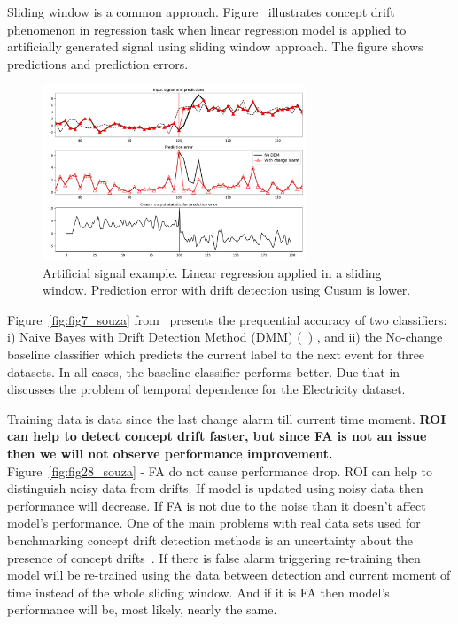 \documentclass[12 pt]{article}
\begin{document}
  Sliding window is a common approach.
  Figure~\cite{fig:art_sig_example} illustrates concept drift phenomenon in regression task when linear regression model is applied to artificially generated signal using sliding window approach. 
  The figure shows predictions and prediction errors.
  \begin{figure}[!htb]
    \centering
    \includegraphics[width=0.7\textwidth]{images/proof_of_concept_linreg_art_sig}
    \caption{Artificial signal example. Linear regression applied in a sliding window. Prediction error with drift detection using Cusum is lower.}\label{fig:art_sig_example}
  \end{figure}

  Figure~\ref{fig:fig7_souza} from~\cite{SouzaRMB20} presents the prequential accuracy of two classifiers: i) Naive Bayes with Drift Detection Method (DMM) (~\cite{gama2004learning}) , and ii) the No-change baseline classifier which predicts the current label to the next event for three datasets. In all cases, the baseline classifier performs better.
  Due that in~\cite{zliobaite2013good} discusses the problem of temporal dependence for the Electricity dataset.

  Training data is data since the last change alarm till current time moment.
  \textbf{ROI can help to detect concept drift faster, but since FA is not an issue then we will not observe performance improvement.}
  Figure~\ref{fig:fig28_souza} - FA do not cause performance drop.
  ROI can help to distinguish noisy data from drifts. If model is updated using noisy data then performance will decrease.
  If FA is not due to the noise than it doesn't affect model's performance. 
  One of the main problems with real data sets used for benchmarking concept drift detection methods is an uncertainty about the presence of concept drifts~\cite{SouzaRMB20}.
  If there is false alarm triggering re-training then model will be re-trained using the data between detection and current moment of time instead of the whole sliding window.
  And if it is FA then model's performance will be, most likely, nearly the same.
\end{document}
